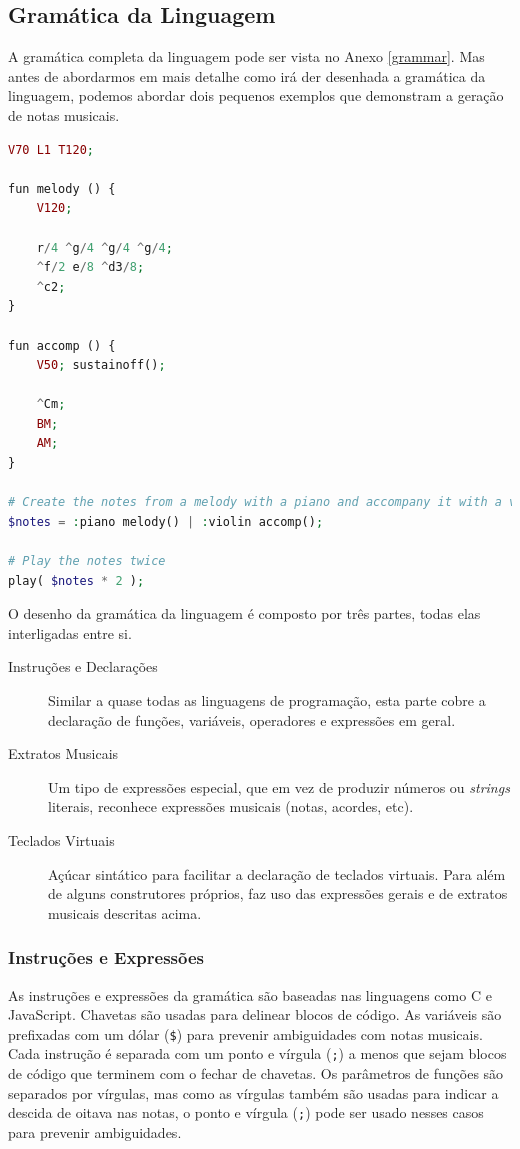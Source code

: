 \subsection{Gramática da Linguagem}
A gramática completa da linguagem pode ser vista no Anexo \ref{grammar}. Mas antes de abordarmos em mais detalhe como irá der desenhada a gramática da linguagem, podemos abordar dois pequenos exemplos que demonstram a geração de notas musicais.
\begin{lstlisting}[caption=Exemplo da sintaxe proposta da linguagem,language=PHP]
V70 L1 T120;

fun melody () {
    V120;

    r/4 ^g/4 ^g/4 ^g/4;
    ^f/2 e/8 ^d3/8; 
    ^c2;
}

fun accomp () {
    V50; sustainoff();

    ^Cm;
    BM; 
    AM;
}

# Create the notes from a melody with a piano and accompany it with a violin in parallel
$notes = :piano melody() | :violin accomp();

# Play the notes twice
play( $notes * 2 );
\end{lstlisting}

O desenho da gramática da linguagem é composto por três partes, todas elas interligadas entre si.
\begin{description}
    \item[Instruções e Declarações] Similar a quase todas as linguagens de programação, esta parte cobre a declaração de funções, variáveis, operadores e expressões em geral.
    \item[Extratos Musicais] Um tipo de expressões especial, que em vez de produzir números ou \textit{strings} literais, reconhece expressões musicais (notas, acordes, etc).
    \item[Teclados Virtuais] Açúcar sintático para facilitar a declaração de teclados virtuais. Para além de alguns construtores próprios, faz uso das expressões gerais e de extratos musicais descritas acima.
\end{description}

\subsubsection{Instruções e Expressões}
As instruções e expressões da gramática são baseadas nas linguagens como C e JavaScript. Chavetas são usadas para delinear blocos de código. As variáveis são prefixadas com um dólar (\texttt{\$}) para prevenir ambiguidades com notas musicais. Cada instrução é separada com um ponto e vírgula (\texttt{;}) a menos que sejam blocos de código que terminem com o fechar de chavetas. Os parâmetros de funções são separados por vírgulas, mas como as vírgulas também são usadas para indicar a descida de oitava nas notas, o ponto e vírgula (\texttt{;}) pode ser usado nesses casos para prevenir ambiguidades.

